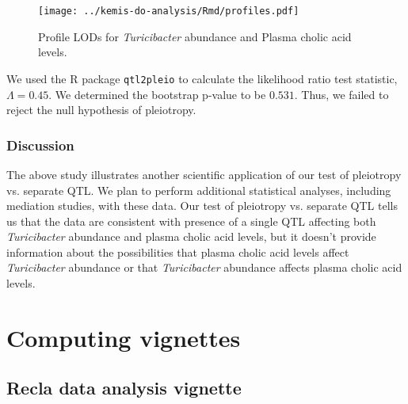 \documentclass[oneside]{book}
\newenvironment{Shaded}{\begin{snugshade}}{\end{snugshade}}
\newcommand{\DataTypeTok}[1]{\textcolor[rgb]{0.13,0.29,0.53}{#1}}
\newcommand{\DecValTok}[1]{\textcolor[rgb]{0.00,0.00,0.81}{#1}}
\newcommand{\KeywordTok}[1]{\textcolor[rgb]{0.13,0.29,0.53}{\textbf{#1}}}
\newcommand{\NormalTok}[1]{#1}
\newcommand{\OperatorTok}[1]{\textcolor[rgb]{0.81,0.36,0.00}{\textbf{#1}}}
\newcommand{\OtherTok}[1]{\textcolor[rgb]{0.56,0.35,0.01}{#1}}
\begin{document}
\begin{figure}
\texttt{[image: ../kemis-do-analysis/Rmd/profiles.pdf]}
\caption{Profile LODs for \emph{Turicibacter} abundance and Plasma cholic acid levels.}
\end{figure}



We used the R package \texttt{qtl2pleio} \citep{qtl2pleio} to calculate the likelihood ratio test statistic, $\Lambda = 0.45$. We determined the bootstrap p-value to be $0.531$. Thus, we failed to reject the null hypothesis of pleiotropy.


\subsection{Discussion}

The above study illustrates another scientific application of our test of pleiotropy vs. separate QTL. We plan to perform additional statistical analyses, including mediation studies, with these data. Our test of pleiotropy vs. separate QTL tells us that the data are consistent with presence of a single QTL affecting both \emph{Turicibacter} abundance and plasma cholic acid levels, but it doesn't provide information about the possibilities that plasma cholic acid levels affect \emph{Turicibacter} abundance or that \emph{Turicibacter} abundance affects plasma cholic acid levels.



\chapter{Computing vignettes}


\section{Recla data analysis vignette}
\begin{Shaded}
\end{Shaded}
\end{document}
